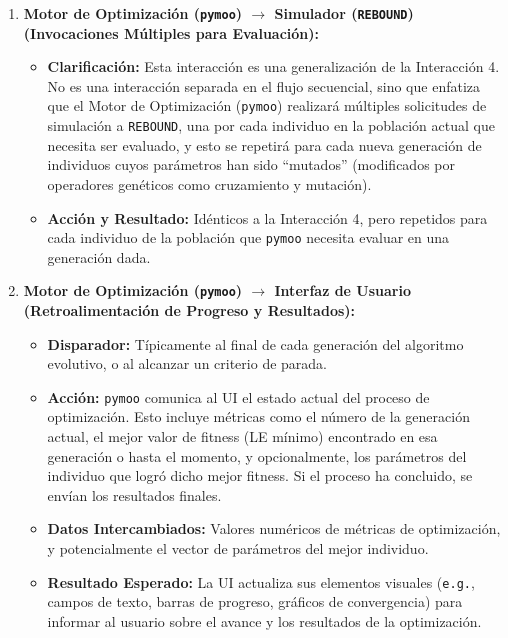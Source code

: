 \begin{enumerate}
    \item \textbf{Motor de Optimización (\texttt{pymoo}) $\rightarrow$ Simulador (\texttt{REBOUND}) (Invocaciones Múltiples para Evaluación):}
    \begin{itemize}
        \item \textbf{Clarificación:} Esta interacción es una generalización de la Interacción 4. No es una interacción separada en el flujo secuencial, sino que enfatiza que el Motor de Optimización (\texttt{pymoo}) realizará múltiples solicitudes de simulación a \texttt{REBOUND}, una por cada individuo en la población actual que necesita ser evaluado, y esto se repetirá para cada nueva generación de individuos cuyos parámetros han sido ``mutados'' (modificados por operadores genéticos como cruzamiento y mutación).
        \item \textbf{Acción y Resultado:} Idénticos a la Interacción 4, pero repetidos para cada individuo de la población que \texttt{pymoo} necesita evaluar en una generación dada.
    \end{itemize}

    \item \textbf{Motor de Optimización (\texttt{pymoo}) $\rightarrow$ Interfaz de Usuario (Retroalimentación de Progreso y Resultados):}
    \begin{itemize}
        \item \textbf{Disparador:} Típicamente al final de cada generación del algoritmo evolutivo, o al alcanzar un criterio de parada.
        \item \textbf{Acción:} \texttt{pymoo} comunica al UI el estado actual del proceso de optimización. Esto incluye métricas como el número de la generación actual, el mejor valor de fitness (LE mínimo) encontrado en esa generación o hasta el momento, y opcionalmente, los parámetros del individuo que logró dicho mejor fitness. Si el proceso ha concluido, se envían los resultados finales.
        \item \textbf{Datos Intercambiados:} Valores numéricos de métricas de optimización, y potencialmente el vector de parámetros del mejor individuo.
        \item \textbf{Resultado Esperado:} La UI actualiza sus elementos visuales (\texttt{e.g.}, campos de texto, barras de progreso, gráficos de convergencia) para informar al usuario sobre el avance y los resultados de la optimización.
    \end{itemize}


\end{enumerate}
